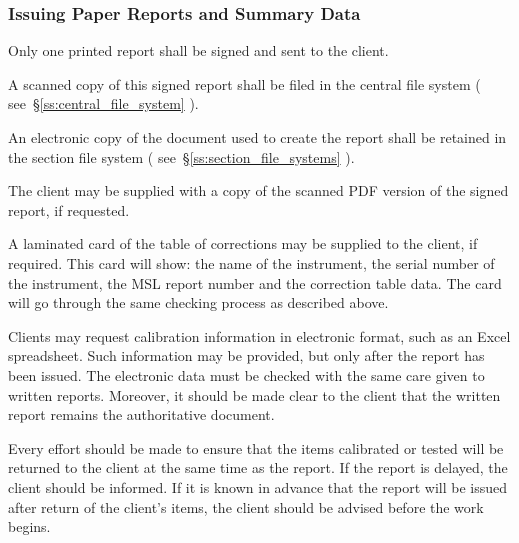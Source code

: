 \subsubsection{Issuing Paper Reports and Summary Data}

Only one printed report shall be signed and sent to the client. 

A scanned copy of this signed report shall be filed in the central file system ( see~\S\ref{ss:central_file_system} ). 

An electronic copy of the document used to create the report shall be retained in the section file system ( see~\S\ref{ss:section_file_systems} ). 
   
The client may be supplied with a copy of the scanned PDF version of the signed report, if requested.

A laminated card of the table of corrections may be supplied to the client, if required.  This card will show: the name of the instrument, the serial number of the instrument, the MSL report number and the correction table data.  The card will go through the same checking process as described above.

Clients may request calibration information in electronic format, such as an Excel spreadsheet. Such information may be provided, but only after the report has been issued. The electronic data must be checked with the same care given to written reports. Moreover, it should be made clear to the client that the written report remains the authoritative document. 

Every effort should be made to ensure that the items calibrated or tested will be returned to the client at the same time as the report. If the report is delayed, the client should be informed. If it is known in advance that the report will be issued after return of the client's items, the client should be advised before the work begins.



